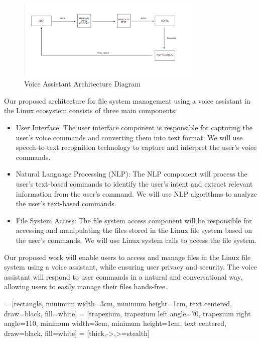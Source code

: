 \documentclass[conference]{IEEEtran}
\begin{document}
\begin{figure}[h]
\centering
\includegraphics[width=3.5in]{1.png}
\caption{Voice Assistant Architecture Diagram}
\label{fig:diagram}
\end{figure}
Our proposed architecture for file system management using a voice assistant in the Linux ecosystem consists of three main components:
\begin{itemize}
    \item User Interface: The user interface component is responsible for capturing the user's voice commands and converting them into text format. We will use speech-to-text recognition technology to capture and interpret the user's voice commands.

    \item Natural Language Processing (NLP): The NLP component will process the user's text-based commands to identify the user's intent and extract relevant information from the user's command. We will use NLP algorithms to analyze the user's text-based commands.

    \item File System Access: The file system access component will be responsible for accessing and manipulating the files stored in the Linux file system based on the user's commands. We will use Linux system calls to access the file system.
\end{itemize}

Our proposed work will enable users to access and manage files in the Linux file system using a voice assistant, while ensuring user privacy and security. The voice assistant will respond to user commands in a natural and conversational way, allowing users to easily manage their files hands-free.
\vspace{1\baselineskip}

\usetikzlibrary{shapes.geometric, arrows}
 = [rectangle, minimum width=3cm, minimum height=1cm, text centered, draw=black, fill=white]
 = [trapezium, trapezium left angle=70, trapezium right angle=110, minimum width=3cm, minimum height=1cm, text centered, draw=black, fill=white]
 = [thick,->,>=stealth]
\end{document}
